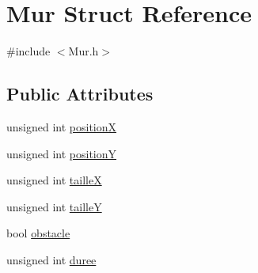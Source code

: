 \hypertarget{structMur}{\section{Mur Struct Reference}
\label{structMur}
}


{\ttfamily \#include $<$Mur.\-h$>$}

\subsection*{Public Attributes}
\begin{DoxyCompactItemize}
\item 
unsigned int \hyperlink{structMur_a864938629ea67ef302ba949854a62a03}{position\-X}
\item 
unsigned int \hyperlink{structMur_aaa7a30342c05f809a65352e9d35f3eef}{position\-Y}
\item 
unsigned int \hyperlink{structMur_a83d5a0639f49e58cfb805a91702d6701}{taille\-X}
\item 
unsigned int \hyperlink{structMur_ad0c6b841ae4069d6b4e6559d7e88cf47}{taille\-Y}
\item 
bool \hyperlink{structMur_af358f2d8774ed45c36982eaf35c64200}{obstacle}
\item 
unsigned int \hyperlink{structMur_a6aceb89c289c02c5da1301142f80202b}{duree}
\end{DoxyCompactItemize}


